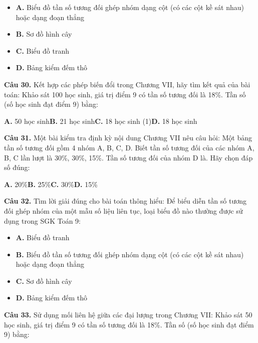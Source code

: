 \documentclass[11pt,a4paper]{article}
\begin{document}
\begin{itemize}\setlength{\itemsep}{1pt}\setlength{\parskip}{0pt}
  \item[] \textbf{A.} Biểu đồ tần số tương đối ghép nhóm dạng cột (có các cột kề sát nhau) hoặc dạng đoạn thẳng
  \item[] \textbf{B.} Sơ đồ hình cây
  \item[] \textbf{C.} Biểu đồ tranh
  \item[] \textbf{D.} Bảng kiểm đếm thô
\end{itemize}\vspace{2pt}
\textbf{\color{primary} Câu 30.} Kết hợp các phép biến đổi trong Chương VII, hãy tìm kết quả của bài toán: Khảo sát 100 học sinh, giá trị điểm 9 có tần số tương đối là 18\%. Tần số (số học sinh đạt điểm 9) bằng:\par
\hspace*{1.5em}\textbf{A.} 50 học sinh\quad\quad \textbf{B.} 21 học sinh\quad\quad \textbf{C.} 18 học sinh (1)\quad\quad \textbf{D.} 18 học sinh\par\vspace{2pt}
\textbf{\color{primary} Câu 31.} Một bài kiểm tra định kỳ nội dung Chương VII nêu câu hỏi: Một bảng tần số tương đối gồm 4 nhóm A, B, C, D. Biết tần số tương đối của các nhóm A, B, C lần lượt là 30\%, 30\%, 15\%. Tần số tương đối của nhóm D là. Hãy chọn đáp số đúng:\par
\hspace*{1.5em}\textbf{A.} 20\%\quad\quad \textbf{B.} 25\%\quad\quad \textbf{C.} 30\%\quad\quad \textbf{D.} 15\%\par\vspace{2pt}
\textbf{\color{primary} Câu 32.} Tìm lời giải đúng cho bài toán thông hiểu: Để biểu diễn tần số tương đối ghép nhóm của một mẫu số liệu liên tục, loại biểu đồ nào thường được sử dụng trong SGK Toán 9:\par
\begin{itemize}\setlength{\itemsep}{1pt}\setlength{\parskip}{0pt}
  \item[] \textbf{A.} Biểu đồ tranh
  \item[] \textbf{B.} Biểu đồ tần số tương đối ghép nhóm dạng cột (có các cột kề sát nhau) hoặc dạng đoạn thẳng
  \item[] \textbf{C.} Sơ đồ hình cây
  \item[] \textbf{D.} Bảng kiểm đếm thô
\end{itemize}\vspace{2pt}
\textbf{\color{primary} Câu 33.} Sử dụng mối liên hệ giữa các đại lượng trong Chương VII: Khảo sát 50 học sinh, giá trị điểm 9 có tần số tương đối là 18\%. Tần số (số học sinh đạt điểm 9) bằng:\par
\end{document}
